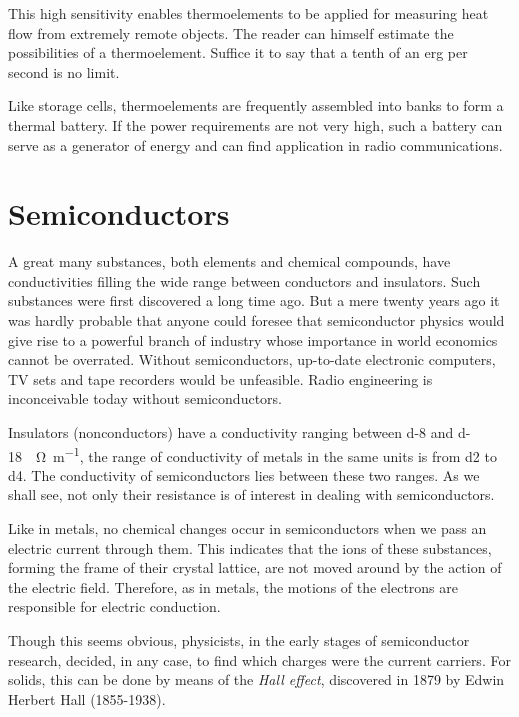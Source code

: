 This high sensitivity enables thermoelements to be applied for measuring heat flow from extremely remote objects. The reader can himself estimate the possibilities of a thermoelement. Suffice it to say that a tenth of an erg per second is no limit.

Like storage cells, thermoelements are frequently assembled into banks to form a thermal battery. If the power requirements are not very high, such a battery can serve as a generator of energy and can find application in radio communications.

\section{Semiconductors}

A great many substances, both elements and chemical compounds, have conductivities filling the wide range between conductors and insulators. Such substances were first discovered a long time ago. But a mere twenty years ago it was hardly probable that anyone could foresee that semiconductor physics would give rise to a powerful branch of industry whose importance in world economics cannot be overrated. Without semiconductors, up-to-date electronic computers, TV sets and tape recorders would be unfeasible. Radio engineering is inconceivable today without semiconductors.


Insulators (nonconductors) have a conductivity ranging between \num{d-8} and \SI{d-18}{\per\ohm\per\meter}, the range of conductivity of metals in the same units is from \num{d2} to \num{d4}. The conductivity of semiconductors lies between these two ranges. As we shall see, not only their resistance is of interest in dealing with semiconductors.

Like in metals, no chemical changes occur in semiconductors when we pass an electric current through them. This indicates that the ions of these substances, forming the frame of their crystal lattice, are not moved around by the action of the electric field. Therefore, as in metals, the motions of the electrons are responsible for electric conduction.

Though this seems obvious, physicists, in the early stages of semiconductor research, decided, in any case, to find which charges were the current carriers. For solids, this can be done by means of the \emph{Hall effect}, discovered in 1879 by Edwin Herbert Hall (1855-1938).

